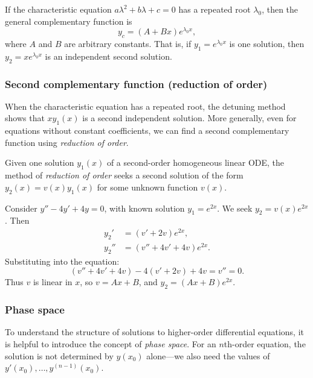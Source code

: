 \documentclass[a4paper]{article}
\begin{document}
\begin{prop}
  If the characteristic equation $a\lambda^2 + b\lambda + c = 0$ has a repeated root $\lambda_0$, then the general complementary function is
  \[
    y_c = (A + Bx)e^{\lambda_0 x},
  \]
  where $A$ and $B$ are arbitrary constants. That is, if $y_1 = e^{\lambda_0 x}$ is one solution, then $y_2 = xe^{\lambda_0 x}$ is an independent second solution.
\end{prop}

\subsubsection{Second complementary function (reduction of order)}
\begin{remark}[Motivation]
  When the characteristic equation has a repeated root, the detuning method shows that $xy_1(x)$ is a second independent solution. More generally, even for equations without constant coefficients, we can find a second complementary function using \emph{reduction of order}.
\end{remark}

\begin{defi}
  Given one solution $y_1(x)$ of a second-order homogeneous linear ODE, the method of \emph{reduction of order} seeks a second solution of the form $y_2(x) = v(x)y_1(x)$ for some unknown function $v(x)$.
\end{defi}

\begin{eg}
  Consider $y'' - 4y' + 4y = 0$, with known solution $y_1 = e^{2x}$. We seek $y_2 = v(x)e^{2x}$. Then
  \begin{align*}
    y_2' &= (v' + 2v)e^{2x},\\
    y_2'' &= (v'' + 4v' + 4v)e^{2x}.
  \end{align*}
  Substituting into the equation:
  \[
    (v'' + 4v' + 4v) - 4(v' + 2v) + 4v = v'' = 0.
  \]
  Thus $v$ is linear in $x$, so $v = Ax + B$, and $y_2 = (Ax + B)e^{2x}$.
\end{eg}

\subsubsection{Phase space}
\begin{remark}[Motivation]
  To understand the structure of solutions to higher-order differential equations, it is helpful to introduce the concept of \emph{phase space}. For an $n$th-order equation, the solution is not determined by $y(x_0)$ alone---we also need the values of $y'(x_0), \ldots, y^{(n-1)}(x_0)$.
\end{remark}
\end{document}
